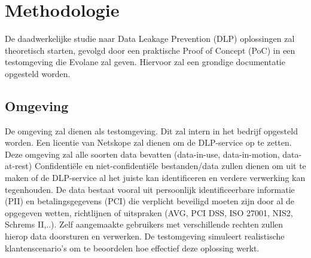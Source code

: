 



\section{Methodologie}%
\label{sec:methodologie}

De daadwerkelijke studie naar Data Leakage Prevention (DLP) oplossingen zal theoretisch starten, gevolgd door een praktische Proof of Concept (PoC) in een testomgeving die Evolane zal geven. Hiervoor zal een grondige documentatie opgesteld worden.

\subsection{Omgeving}%

De omgeving zal dienen als testomgeving. Dit zal intern in het bedrijf opgesteld worden. Een licentie van Netskope zal dienen om de DLP-service op te zetten. Deze omgeving zal alle soorten data bevatten (data-in-use, data-in-motion, data-at-rest)  Confidentiële en niet-confidentiële bestanden/data zullen dienen om uit te maken of de DLP-service al het juiste kan identificeren en verdere verwerking kan tegenhouden. De data bestaat vooral uit persoonlijk identificeerbare informatie (PII) en betalingsgegevens (PCI) die verplicht beveiligd moeten zijn door al de opgegeven wetten, richtlijnen of uitspraken (AVG, PCI DSS, ISO 27001, NIS2, Schrems II,..).  Zelf aangemaakte gebruikers met verschillende rechten zullen hierop data doorsturen en verwerken. De testomgeving simuleert realistische klantenscenario’s om te beoordelen hoe effectief deze oplossing werkt.


